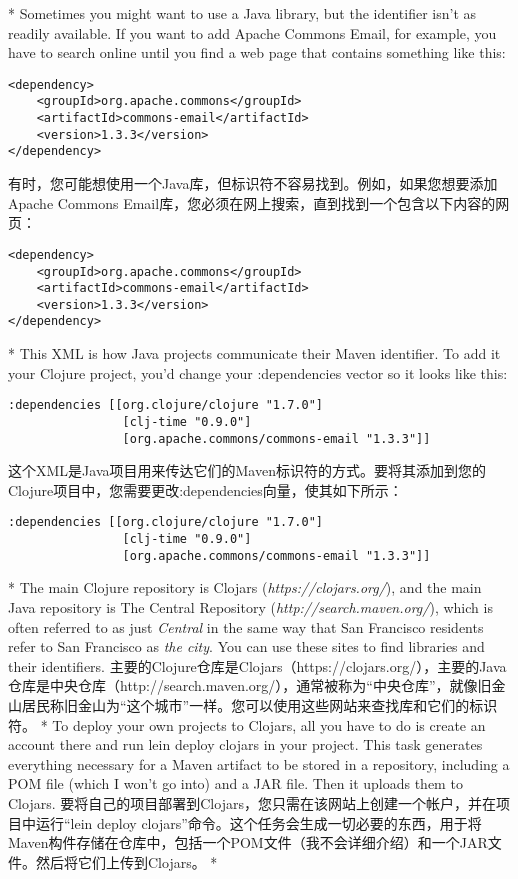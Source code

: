 \documentclass{book}
\begin{document}
\begin{paracol}{2}
\switchcolumn[0]*
Sometimes you might want to use a Java library, but the identifier isn't
as readily available. If you want to add Apache Commons Email, for
example, you have to search online until you find a web page that
contains something like this:
\begin{verbatim}
<dependency>
    <groupId>org.apache.commons</groupId>
    <artifactId>commons-email</artifactId>
    <version>1.3.3</version>
</dependency>
\end{verbatim}
\switchcolumn
有时，您可能想使用一个Java库，但标识符不容易找到。例如，如果您想要添加Apache Commons Email库，您必须在网上搜索，直到找到一个包含以下内容的网页：
\begin{verbatim}
<dependency>
    <groupId>org.apache.commons</groupId>
    <artifactId>commons-email</artifactId>
    <version>1.3.3</version>
</dependency>
\end{verbatim}
\switchcolumn[0]*
This XML is how Java projects communicate their Maven identifier. To add
it your Clojure project, you'd change your :dependencies vector so it
looks like this:
\begin{verbatim}
:dependencies [[org.clojure/clojure "1.7.0"]
                [clj-time "0.9.0"]
                [org.apache.commons/commons-email "1.3.3"]]
\end{verbatim}
\switchcolumn
这个XML是Java项目用来传达它们的Maven标识符的方式。要将其添加到您的Clojure项目中，您需要更改:dependencies向量，使其如下所示：
\begin{verbatim}
:dependencies [[org.clojure/clojure "1.7.0"]
                [clj-time "0.9.0"]
                [org.apache.commons/commons-email "1.3.3"]]
\end{verbatim}
\switchcolumn[0]*
The main Clojure repository is Clojars (\emph{https://clojars.org/}),
and the main Java repository is The Central Repository
(\emph{http://search.maven.org/}), which is often referred to as just
\emph{Central} in the same way that San Francisco residents refer to San
Francisco as \emph{the city}. You can use these sites to find libraries
and their identifiers.
\switchcolumn
主要的Clojure仓库是Clojars（https://clojars.org/），主要的Java仓库是中央仓库（http://search.maven.org/），通常被称为“中央仓库”，就像旧金山居民称旧金山为“这个城市”一样。您可以使用这些网站来查找库和它们的标识符。
\switchcolumn[0]*
To deploy your own projects to Clojars, all you have to do is create an
account there and run lein deploy clojars in your project. This task
generates everything necessary for a Maven artifact to be stored in a
repository, including a POM file (which I won't go into) and a JAR file.
Then it uploads them to Clojars.
\switchcolumn
要将自己的项目部署到Clojars，您只需在该网站上创建一个帐户，并在项目中运行“lein deploy clojars”命令。这个任务会生成一切必要的东西，用于将Maven构件存储在仓库中，包括一个POM文件（我不会详细介绍）和一个JAR文件。然后将它们上传到Clojars。
\switchcolumn[0]*

\end{paracol}
\end{document}
